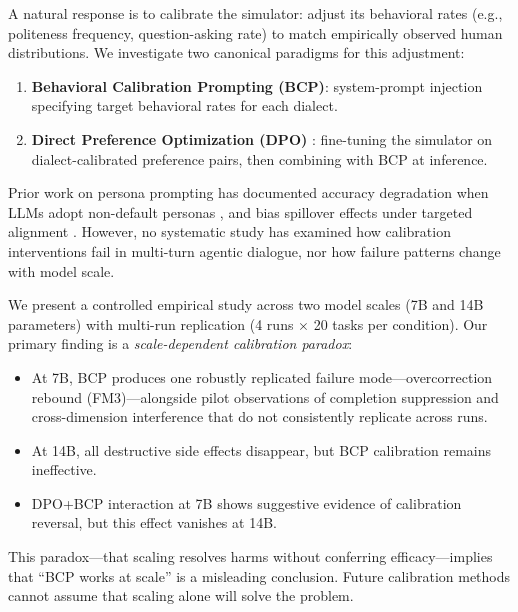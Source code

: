 \documentclass[11pt]{article}
\begin{document}
A natural response is to calibrate the simulator: adjust its behavioral rates (e.g., politeness frequency, question-asking rate) to match empirically observed human distributions.
We investigate two canonical paradigms for this adjustment:
\begin{enumerate}
    \item \textbf{Behavioral Calibration Prompting (BCP)}: system-prompt injection specifying target behavioral rates for each dialect.
    \item \textbf{Direct Preference Optimization (DPO)} \citep{rafailov2023dpo}: fine-tuning the simulator on dialect-calibrated preference pairs, then combining with BCP at inference.
\end{enumerate}

Prior work on persona prompting has documented accuracy degradation when LLMs adopt non-default personas \citep{basil2025playing_pretend, hu2026expert_persona}, and bias spillover effects under targeted alignment \citep{gupta2026intra_fairness}.
However, no systematic study has examined how calibration interventions fail in multi-turn agentic dialogue, nor how failure patterns change with model scale.

We present a controlled empirical study across two model scales (7B and 14B parameters) with multi-run replication (4 runs $\times$ 20 tasks per condition).
Our primary finding is a \emph{scale-dependent calibration paradox}:
\begin{itemize}
    \item At 7B, BCP produces one robustly replicated failure mode---overcorrection rebound (FM3)---alongside pilot observations of completion suppression and cross-dimension interference that do not consistently replicate across runs.
    \item At 14B, all destructive side effects disappear, but BCP calibration remains ineffective.
    \item DPO+BCP interaction at 7B shows suggestive evidence of calibration reversal, but this effect vanishes at 14B.
\end{itemize}

This paradox---that scaling resolves harms without conferring efficacy---implies that ``BCP works at scale'' is a misleading conclusion.
Future calibration methods cannot assume that scaling alone will solve the problem.
\end{document}
